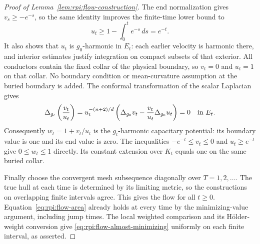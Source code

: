 \begin{proof}[Proof of Lemma~\ref{lem:rpi:flow-construction}]
The end normalization gives $v_s\ge-e^{-s}$, so the same
identity improves the finite-time lower bound to
\[
 u_t\ge1-\int_0^t e^{-s}\,ds=e^{-t}.
\]
It also shows that $u_t$ is $g_0$-harmonic in $E_t$:
each earlier velocity is harmonic there, and interior estimates
justify integration on compact subsets of that exterior. All
conductors contain the fixed collar of the physical boundary,
so $v_t=0$ and $u_t=1$ on that collar. No boundary condition or
mean-curvature assumption at the buried boundary is added.
The conformal transformation of the scalar Laplacian gives
\[
 \Delta_{g_t}\left(\frac{v_t}{u_t}\right)
 =u_t^{-(n+2)/d}
   \left(\Delta_{g_0}v_t-\frac{v_t}{u_t}\Delta_{g_0}u_t\right)=0
 \quad\hbox{in }E_t.
\]
Consequently $w_t=1+v_t/u_t$ is the $g_t$-harmonic capacitary
potential: its boundary value is one and its end value is zero.
The inequalities $-e^{-t}\le v_t\le0$ and $u_t\ge e^{-t}$
give $0\le w_t\le1$ directly. Its constant extension over $K_t$
equals one on the same buried collar.

Finally choose the convergent mesh subsequence diagonally over
$T=1,2,\ldots$. The true hull at each time is determined by its
limiting metric, so the constructions on overlapping finite
intervals agree. This gives the flow for all $t\ge0$.
Equation~\eqref{eq:rpi:flow-area} already holds at every time by
the minimizing-value argument, including jump times. The local
weighted comparison and its H\"older-weight conversion give
\eqref{eq:rpi:flow-almost-minimizing} uniformly on each finite
interval, as asserted.
\end{proof}
